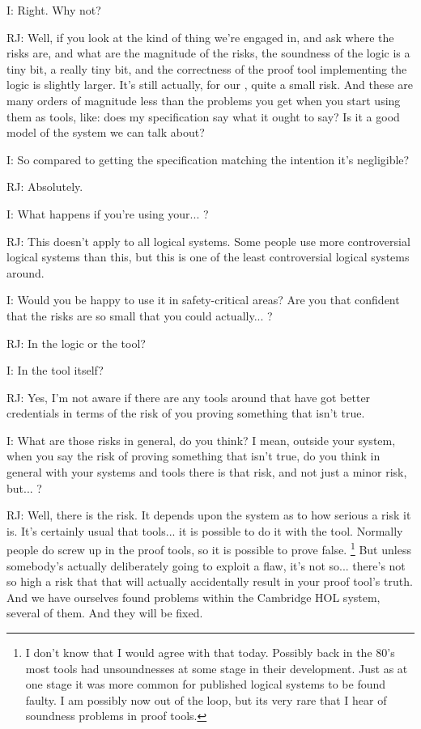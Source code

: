 \documentclass[10pt,titlepage]{book}
\begin{document}
I: Right.
Why not?

RJ: Well, if you look at the kind of thing we're engaged in, and ask where the risks are, and what are the magnitude of the risks, the soundness of the logic is a tiny bit, a really tiny bit, and the correctness of the proof tool implementing the logic is slightly larger.
It's still actually, for our	, quite a small risk.
And these are many orders of magnitude less than the problems you get when you start using them as tools, like: does my specification say what it ought to say?
Is it a good model of the system we can talk about?

I: So compared to getting the specification matching the intention it's negligible?

RJ: Absolutely.

I: What happens if you're using your... ?

RJ: This doesn't apply to all logical systems.
Some people use more controversial logical systems than this, but this is one of the least controversial logical systems around.

I: Would you be happy to use it in safety-critical areas?
Are you that confident that the risks are so small that you could actually... ?

RJ: In the logic or the tool?

I: In the tool itself?

RJ: Yes, I'm not aware if there are any tools around that have got better credentials in terms of the risk of you proving something that isn't true.

I: What are those risks in general, do you think?
I mean, outside your system, when you say the risk of proving something that isn't true, do you think in general with your systems and tools there is that risk, and not just a minor risk, but... ?

RJ: Well, there is the risk.
It depends upon the system as to how serious a risk it is.
It's certainly usual that tools... it is possible to do it with the tool.
Normally people do screw up in the proof tools, so it is possible to prove false.%
\footnote{
I don't know that I would agree with that today.
Possibly back in the 80's most tools had unsoundnesses at some stage in their development.
Just as at one stage it was more common for published logical systems to be found faulty.
I am possibly now out of the loop, but its very rare that I hear of soundness problems in proof tools.
}
But unless somebody's actually deliberately going to exploit a flaw, it's not so... there's not so high a risk that that will actually accidentally result in your proof tool's truth.
And we have ourselves found problems within the Cambridge HOL system, several of them.
And they will be fixed.
\end{document}
